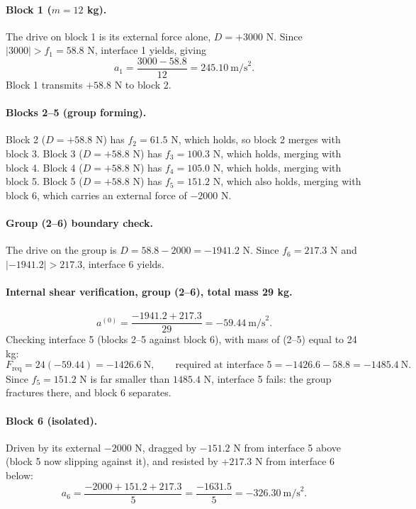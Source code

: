 \documentclass[11pt,a4paper]{article}
\begin{document}
\paragraph{Block 1 ($m=12$ kg).} The drive on block 1 is its external force alone, $D=+3000$ N. Since $|3000| > f_1 = 58.8$ N, interface 1 yields, giving
\[
a_1 = \frac{3000 - 58.8}{12} = 245.10\ \text{m/s}^2 .
\]
Block 1 transmits $+58.8$ N to block 2.

\paragraph{Blocks 2--5 (group forming).} Block 2 ($D=+58.8$ N) has $f_2 = 61.5$ N, which holds, so block 2 merges with block 3. Block 3 ($D=+58.8$ N) has $f_3 = 100.3$ N, which holds, merging with block 4. Block 4 ($D=+58.8$ N) has $f_4 = 105.0$ N, which holds, merging with block 5. Block 5 ($D=+58.8$ N) has $f_5 = 151.2$ N, which also holds, merging with block 6, which carries an external force of $-2000$ N.

\paragraph{Group (2--6) boundary check.} The drive on the group is $D = 58.8 - 2000 = -1941.2$ N. Since $f_6 = 217.3$ N and $|{-1941.2}| > 217.3$, interface 6 yields.

\paragraph{Internal shear verification, group (2--6), total mass 29 kg.}
\[
a^{(0)} = \frac{-1941.2 + 217.3}{29} = -59.44\ \text{m/s}^2 .
\]
Checking interface 5 (blocks 2--5 against block 6), with mass of (2--5) equal to 24 kg:
\[
F_{\mathrm{req}} = 24(-59.44) = -1426.6\ \text{N}, \qquad \text{required at interface 5} = -1426.6 - 58.8 = -1485.4\ \text{N}.
\]
Since $f_5 = 151.2$ N is far smaller than $1485.4$ N, interface 5 fails: the group fractures there, and block 6 separates.

\paragraph{Block 6 (isolated).} Driven by its external $-2000$ N, dragged by $-151.2$ N from interface 5 above (block 5 now slipping against it), and resisted by $+217.3$ N from interface 6 below:
\[
a_6 = \frac{-2000+151.2+217.3}{5} = \frac{-1631.5}{5} = -326.30\ \text{m/s}^2 .
\]
\end{document}
